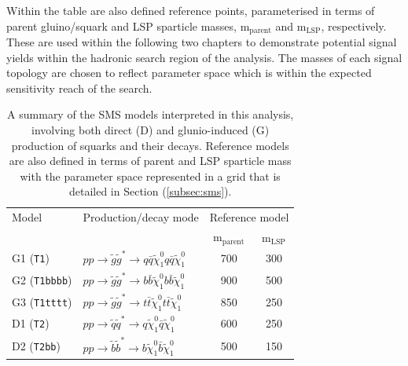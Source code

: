 Within the table are also defined reference points, parameterised in terms of parent gluino/squark and \ac{LSP} sparticle masses, m$_{\text{parent}}$ and m$_{\text{LSP}}$, respectively. These are used within the following two chapters to demonstrate potential signal yields within the hadronic search region of the analysis. The masses of each signal topology are chosen to reflect parameter space which is within the expected sensitivity reach of the search. 

\begin{table}[h!]
\footnotesize
\begin{center}
\begin{tabular*}{0.75\textwidth}{@{\extracolsep{\fill}}llcc}
\hline
Model & Production/decay mode &  \multicolumn{2}{c}{Reference model}\\ 
&& m$_{\text{parent}}$ & m$_{\text{LSP}}$ \\  \hline\hline
G1 (\texttt{T1}) & $ pp \rightarrow \widetilde{g}\widetilde{g}^{*} \rightarrow q\bar{q}\widetilde{\chi}^{0}_{1}q\bar{q}\widetilde{\chi}^{0}_{1}$ & 700 & 300 \\
G2 (\texttt{T1bbbb}) & $ pp \rightarrow \widetilde{g}\widetilde{g}^{*} \rightarrow b\bar{b}\widetilde{\chi}^{0}_{1}b\bar{b}\widetilde{\chi}^{0}_{1}$ & 900 & 500 \\
G3 (\texttt{T1tttt}) & $ pp \rightarrow \widetilde{g}\widetilde{g}^{*} \rightarrow t\bar{t}\widetilde{\chi}^{0}_{1}t\bar{t}\widetilde{\chi}^{0}_{1}$ & 850 & 250 \\
D1 (\texttt{T2}) & $ pp \rightarrow \widetilde{q}\widetilde{q}^{*} \rightarrow q\widetilde{\chi}^{0}_{1}\bar{q}\widetilde{\chi}^{0}_{1}$ & 600 & 250 \\
D2 (\texttt{T2bb}) & $ pp \rightarrow \widetilde{b}\widetilde{b}^{*} \rightarrow b\widetilde{\chi}^{0}_{1}\bar{b}\widetilde{\chi}^{0}_{1}$ & 500 & 150 \\
\cline{1-4}
\end{tabular*}
\end{center}
\caption[A summary of the \ac{SMS} models interpreted in this analysis, involving both direct (D) and glunio-induced (G) production of squarks and their decays.]{A summary of the \ac{SMS} models interpreted in this analysis, involving both direct (D) and glunio-induced (G) production of squarks and their decays. Reference models are also defined in terms of parent and \ac{LSP} sparticle mass with the parameter space represented in a grid that is detailed in Section (\ref{subsec:sms}). }
\label{tab:sms_model_table}
\end{table}

